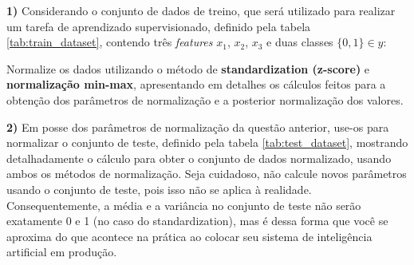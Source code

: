 \documentclass[a4paper,12pt]{article} %
\begin{document}
\noindent\textbf{1)} Considerando o conjunto de dados de treino, que será utilizado para realizar um tarefa de aprendizado supervisionado, definido pela tabela \ref{tab:train_dataset}, contendo três \textit{features} $x_1$, $x_2$, $x_3$ e duas classes $\{0, 1\} \in y$:
\begin{table}[htp]
    \centering
    \caption{Conjunto de dados de treino contendo três \textit{features} e duas classes.}
\label{tab:train_dataset}
\end{table}

Normalize os dados utilizando o método de \textbf{standardization (z-score)} e \textbf{normalização min-max}, apresentando em detalhes os cálculos feitos para a obtenção dos parâmetros de normalização e a posterior normalização dos valores.

\vspace{1.2cm}

\noindent\textbf{2)}  Em posse dos parâmetros de normalização da questão anterior, use-os para normalizar o conjunto de teste, definido pela tabela \ref{tab:test_dataset}, mostrando detalhadamente o cálculo para obter o conjunto de dados normalizado, usando ambos os métodos de normalização. Seja cuidadoso, não calcule novos parâmetros usando o conjunto de teste, pois isso não se aplica à realidade. Consequentemente, a média e a variância no conjunto de teste não serão exatamente 0 e 1 (no caso do standardization), mas é dessa forma que você se aproxima do que acontece na prática ao colocar seu sistema de inteligência artificial em produção.

\begin{table}[htp]
    \centering
    \caption{Conjunto de dados de teste contendo três \textit{features}}
\label{tab:test_dataset}
\end{table}
\end{document}
